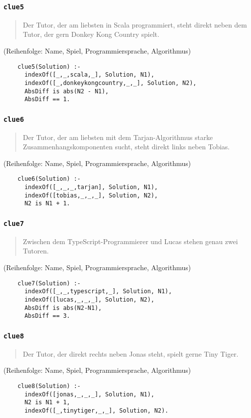 \documentclass{beamer}
\begin{document}
\begin{frame}[fragile]
  \prolog
  \frametitle{\lstinline{clue5}}
  \begin{quote}
    Der Tutor, der am liebsten in Scala programmiert, steht direkt neben dem Tutor, der gern Donkey Kong Country spielt.
  \end{quote}
  \small{(Reihenfolge: Name, Spiel, Programmiersprache, Algorithmus)}
  \pause
  \begin{lstlisting}
    clue5(Solution) :-
      indexOf([_,_,scala,_], Solution, N1),
      indexOf([_,donkeykongcountry,_,_], Solution, N2),
      AbsDiff is abs(N2 - N1),
      AbsDiff == 1.
  \end{lstlisting}
\end{frame}

\begin{frame}[fragile]
  \prolog
  \frametitle{\lstinline{clue6}}
  \begin{quote}
    Der Tutor, der am liebsten mit dem Tarjan-Algorithmus starke Zusammenhangskomponenten sucht, steht direkt links neben Tobias.
  \end{quote}
  \small{(Reihenfolge: Name, Spiel, Programmiersprache, Algorithmus)}
  \pause
  \begin{lstlisting}
    clue6(Solution) :-
      indexOf([_,_,_,tarjan], Solution, N1),
      indexOf([tobias,_,_,_], Solution, N2),
      N2 is N1 + 1.
  \end{lstlisting}
\end{frame}

\begin{frame}[fragile]
  \prolog
  \frametitle{\lstinline{clue7}}
  \begin{quote}
    Zwischen dem TypeScript-Programmierer und Lucas stehen genau zwei Tutoren.
  \end{quote}
  \small{(Reihenfolge: Name, Spiel, Programmiersprache, Algorithmus)}
  \pause
  \begin{lstlisting}
    clue7(Solution) :-
      indexOf([_,_,typescript,_], Solution, N1),
      indexOf([lucas,_,_,_], Solution, N2),
	  AbsDiff is abs(N2-N1),
	  AbsDiff == 3.
  \end{lstlisting}
\end{frame}

\begin{frame}[fragile]
  \prolog
  \frametitle{\lstinline{clue8}}
  \begin{quote}
    Der Tutor, der direkt rechts neben Jonas steht, spielt gerne Tiny Tiger.
  \end{quote}
  \small{(Reihenfolge: Name, Spiel, Programmiersprache, Algorithmus)}
  \pause
  \begin{lstlisting}
    clue8(Solution) :-
      indexOf([jonas,_,_,_], Solution, N1),
      N2 is N1 + 1,
      indexOf([_,tinytiger,_,_], Solution, N2).
  \end{lstlisting}
\end{frame}
\end{document}
